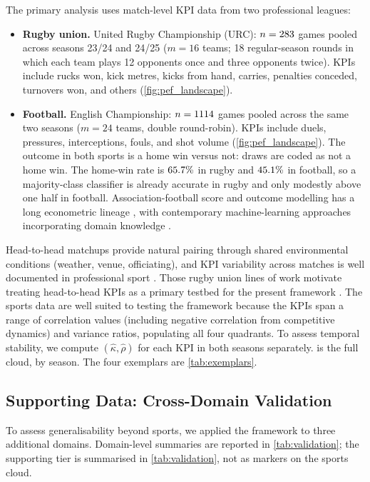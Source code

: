 The primary analysis uses match-level KPI data from two professional leagues:
\begin{itemize}
  \item \textbf{Rugby union.} United Rugby Championship ({URC}): $n=283$ games pooled across seasons 23/24 and 24/25 ($m=16$ teams; 18 regular-season rounds in which each team plays 12 opponents once and three opponents twice). KPIs include rucks won, kick metres, kicks from hand, carries, penalties conceded, turnovers won, and others (\cref{fig:pef_landscape}).
  \item \textbf{Football.} English Championship: $n=1114$ games pooled across the same two seasons ($m=24$ teams, double round-robin). KPIs include duels, pressures, interceptions, fouls, and shot volume (\cref{fig:pef_landscape}). The outcome in both sports is a home win versus not: draws are coded as not a home win. The home-win rate is $65.7\%$ in rugby and $45.1\%$ in football, so a majority-class classifier is already accurate in rugby and only modestly above one half in football. Association-football score and outcome modelling has a long econometric lineage \parencite{dixon1997,boulier2003}, with contemporary machine-learning approaches incorporating domain knowledge \parencite{berrar2019}.
\end{itemize}
Head-to-head matchups provide natural pairing through shared environmental conditions (weather, venue, officiating), and KPI variability across matches is well documented in professional sport \parencite{malcata2014}. Those rugby union lines of work motivate treating head-to-head KPIs as a primary testbed for the present framework \parencite{bennett2019descriptive,bennett2021predicting,mosey2020,scott2023urc,scott2023womens}. The sports data are well suited to testing the framework because the KPIs span a range of correlation values (including negative correlation from competitive dynamics) and variance ratios, populating all four quadrants. To assess temporal stability, we compute $(\hat{\kappa},\hat{\rho})$ for each KPI in both seasons separately.  is the full cloud, by season. The four exemplars are \cref{tab:exemplars}.

\subsection{Supporting Data: Cross-Domain Validation}

To assess generalisability beyond sports, we applied the framework to three additional domains. Domain-level summaries are reported in \cref{tab:validation}; the supporting tier is summarised in \cref{tab:validation}, not as markers on the sports cloud.

